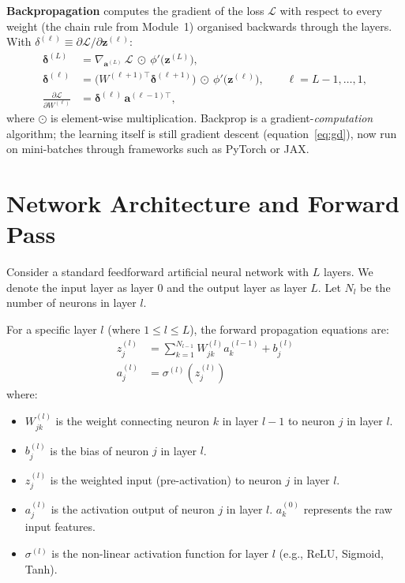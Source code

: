 \documentclass[11pt,a4paper]{article}
\begin{document}
	\textbf{Backpropagation} \parencite{rumelhart1986} computes the
	gradient of the loss $\mathcal{L}$ with respect to every weight 
	(the chain rule from Module~1) organised backwards through the layers. With
	$\delta^{(\ell)} \equiv \partial \mathcal{L}/\partial
	\mathbf{z}^{(\ell)}$:
	\begin{align}
		\boldsymbol{\delta}^{(L)}
		&= \nabla_{\mathbf{a}^{(L)}}\,\mathcal{L}\ \odot\
		\phi'\!\bigl(\mathbf{z}^{(L)}\bigr),\\
		\boldsymbol{\delta}^{(\ell)}
		&= \bigl(W^{(\ell+1)\top}\boldsymbol{\delta}^{(\ell+1)}\bigr)\ \odot\
		\phi'\!\bigl(\mathbf{z}^{(\ell)}\bigr),
		\qquad \ell = L-1, \dots, 1,\\
		\frac{\partial \mathcal{L}}{\partial W^{(\ell)}}
		&= \boldsymbol{\delta}^{(\ell)}\,
		\mathbf{a}^{(\ell-1)\top},
	\end{align}
	where $\odot$ is element-wise multiplication. Backprop is a
	gradient-\emph{computation} algorithm; the learning itself is still
	gradient descent (equation~\eqref{eq:gd}), now run on mini-batches
	through frameworks such as PyTorch or JAX.

\section{Network Architecture and Forward Pass}

Consider a standard feedforward artificial neural network with $L$ layers. We denote the input layer as layer $0$ and the output layer as layer $L$. Let $N_l$ be the number of neurons in layer $l$.

For a specific layer $l$ (where $1 \le l \le L$), the forward propagation equations are:
\begin{align}
	z_j^{(l)} &= \sum_{k=1}^{N_{l-1}} W_{jk}^{(l)} a_k^{(l-1)} + b_j^{(l)} \\
	a_j^{(l)} &= \sigma^{(l)}\left( z_j^{(l)} \right)
\end{align}
where:
\begin{itemize}
	\item $W_{jk}^{(l)}$ is the weight connecting neuron $k$ in layer $l-1$ to neuron $j$ in layer $l$.
	\item $b_j^{(l)}$ is the bias of neuron $j$ in layer $l$.
	\item $z_j^{(l)}$ is the weighted input (pre-activation) to neuron $j$ in layer $l$.
	\item $a_j^{(l)}$ is the activation output of neuron $j$ in layer $l$. $a_k^{(0)}$ represents the raw input features.
	\item $\sigma^{(l)}$ is the non-linear activation function for layer $l$ (e.g., ReLU, Sigmoid, Tanh).
\end{itemize}
\end{document}
